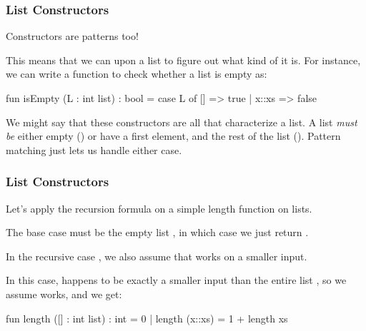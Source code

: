 \documentclass[aspectratio=169, handout]{beamer}
\begin{document}
\begin{frame}[fragile]
  \frametitle{List Constructors}

  Constructors are patterns too!

  \pause
  \vspace{\fill}

  This means that we can  upon a list to figure out what kind of
   it is. For instance, we can write a function to check whether
  a list is empty as:

  \pause

  \begin{codeblock}
    fun isEmpty (L : int list) : bool =
      case L of
        [] => true
      | x::xs => false
  \end{codeblock}

  \pause
  \vspace{\fill}

  We might say that these constructors are all that characterize a list. A list
  \textit{must be} either empty (\code{[]}) or have a first element, and the rest of
  the list (). Pattern matching just lets us handle either case.
\end{frame}

\begin{frame}[fragile]
  \frametitle{List Constructors}

  Let's apply the recursion formula on a simple length function on lists.

  \pause
  \vspace{\fill}

  The base case must be the empty list \code{[]}, in which case we just return .

  \pause
  \vspace{10pt}

  In the recursive case , we also assume that  works on a smaller
  input.

  \pause
  \vspace{5pt}

  In this case,  happens to be exactly a smaller input than the entire
  list , so we assume  works, and we get:

  \pause
  \vspace{\fill}

  \begin{codeblock}
    fun length ([] : int list) : int = 0
      | length (x::xs) = 1 + length xs
  \end{codeblock}
\end{frame}
\end{document}
